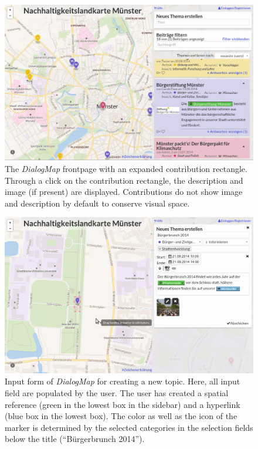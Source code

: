 \begin{figure}[b]
    \centering
    \includegraphics[width=1\columnwidth]{images/screenshot_expanded}
    \caption{The \textit{DialogMap} frontpage with an expanded contribution rectangle. Through a click on the contribution rectangle, the description and image (if present) are displayed. Contributions do not show image and description by default to conserve visual space.}
    \label{fig:screenshot_expanded}
\end{figure}

\begin{figure}[t]
    \centering
    \includegraphics[width=1\columnwidth]{images/screenshot_create}
    \caption{Input form of \textit{DialogMap} for creating a new topic. Here, all input field are populated by the user. The user has created a spatial reference (green in the lowest box in the sidebar) and a hyperlink (blue box in the lowest box). The color as well as the icon of the marker is determined by the selected categories in the selection fields below the title (``Bürgerbrunch 2014'').}
    \label{fig:screenshot_create}
\end{figure}


